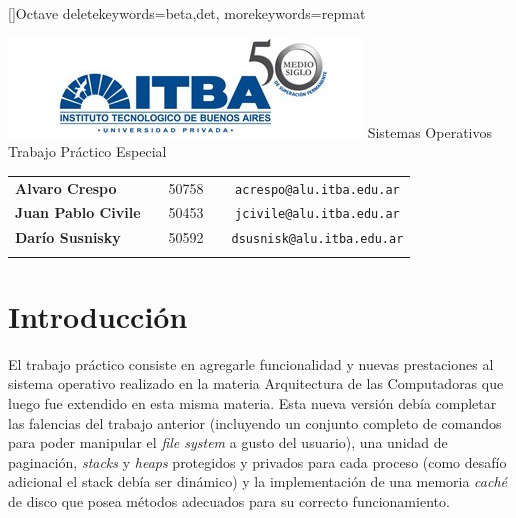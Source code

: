 \documentclass[a4paper,10pt]{article}
\begin{document}
\renewcommand{\lstlistingname}{C\'odigo Fuente}
[]{Octave}{
	deletekeywords={beta,det},
	morekeywords={repmat}
} 
\begin{titlepage}
        \thispagestyle{empty}
        \begin{center}
                \includegraphics{./images/itba.jpg}
                \vfill
                \Huge{Sistemas Operativos}\\
                \vspace{1cm}
                \huge{Trabajo Práctico Especial}\\
        \end{center}
        \vspace{2cm}
        \large{
                \begin{tabular}{lcrc}
                        \textbf{Alvaro Crespo} & & 50758 & \ \ \texttt{acrespo@alu.itba.edu.ar}\\
                        \textbf{Juan Pablo Civile} & & 50453 & \ \ \texttt{jcivile@alu.itba.edu.ar}\\
                        \textbf{Darío Susnisky} & & 50592 & \ \ \texttt{dsusnisk@alu.itba.edu.ar}\\
                        \\ 
                \end{tabular}
        }
        \vfill
\end{titlepage}

\setcounter{page}{1}

\tableofcontents
\newpage
\section{Introducción}
El trabajo práctico consiste en agregarle funcionalidad y nuevas prestaciones al sistema operativo realizado en la materia 
Arquitectura de las Computadoras que luego fue extendido en esta misma materia. Esta nueva versión debía completar las falencias 
del trabajo anterior (incluyendo un conjunto completo de comandos para poder manipular el \textit{file system} a gusto del 
usuario), una unidad de paginación, \textit{stacks} y \textit{heaps} protegidos y privados para cada proceso (como desafío adicional 
el stack debía ser dinámico) y la implementación de una memoria \textit{caché} de disco que posea métodos adecuados para su correcto 
funcionamiento.
\end{document}
